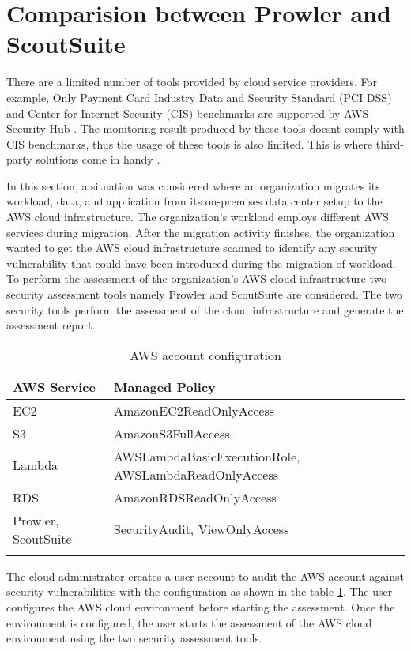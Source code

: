 \section{Comparision between Prowler and ScoutSuite}

\par There are a limited number of tools provided by cloud service providers.
For example, Only Payment Card Industry Data and Security Standard (PCI DSS) and Center for Internet Security (CIS) benchmarks are supported by AWS Security Hub \cite{74}.
The monitoring result produced by these tools doesnt comply with CIS benchmarks, thus the usage of these tools is also limited.
This is where third-party solutions come in handy \cite{74}.
\\
\par In this section, a situation was considered where an organization migrates its workload, data, and application from its on-premises data center setup to the AWS cloud infrastructure.
The organization’s workload employs different AWS services during migration.
After the migration activity finishes, the organization wanted to get the AWS cloud infrastructure scanned to identify any security vulnerability that could have been introduced during the migration of workload.
To perform the assessment of the organization’s AWS cloud infrastructure two security assessment tools namely Prowler and ScoutSuite are considered.
The two security tools perform the assessment of the cloud infrastructure and generate the assessment report.
\\
\begin{longtable}{|p{6cm}|p{8cm}|}
    \hline
    \textbf{AWS Service} & \textbf{Managed Policy}\\
    \hline
    EC2 & AmazonEC2ReadOnlyAccess \\
    \hline
    S3 & AmazonS3FullAccess \\
    \hline
    Lambda & AWSLambdaBasicExecutionRole,
    AWSLambdaReadOnlyAccess \\
    \hline
    RDS & AmazonRDSReadOnlyAccess \\
    \hline
    Prowler, ScoutSuite & SecurityAudit, ViewOnlyAccess \\
    \hline
    \caption{AWS account configuration}
    \label{tab:accountconfiguration}
\end{longtable}

\par The cloud administrator creates a user account to 
audit the AWS account against security vulnerabilities 
with the configuration as shown in the table \ref{tab:accountconfiguration}.
The user configures the AWS cloud environment before starting the assessment.
Once the environment is configured, the user
starts the assessment of the AWS cloud environment using the two security assessment tools.

